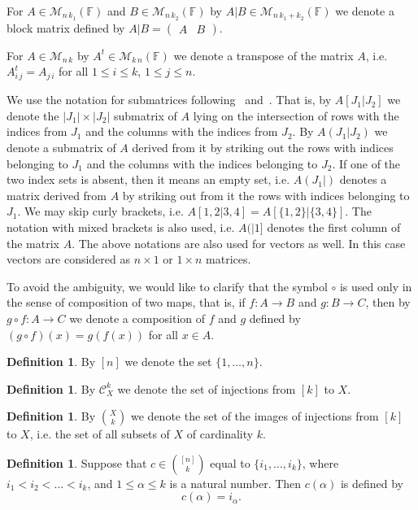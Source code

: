 \documentclass{elsarticle}
\def\F{{\mathbb F}}
\def\M{{\mathcal M}}
\theoremstyle{plain}
\theoremstyle{definition}
\newtheorem{definition}[theorem]{Definition}
\numberwithin{equation}{section}
\begin{document}
For $A \in \M_{n\,k_1}(\F)$ and $B \in \M_{n\,k_2}(\F)$ by $A|B \in \M_{n\,k_1+k_2}(\F)$ we denote a block matrix defined by $A|B = \begin{pmatrix} A & B\end{pmatrix}$.

For $A \in \M_{n\,k}$ by $A^t \in \M_{k\,n}(\F)$ we denote a transpose of the matrix $A$, i.e. $A^{t}_{i\,j} = A_{j\,i}$ for all $1 \le i \le k$, $1 \le j \le n$.


We use the notation for submatrices following~\cite{Minc1984} and~\cite{Pierce1979}. That is, by $A[J_1|J_2]$ we denote the $|J_1 |\times |J_2|$ submatrix of $A$ lying on the intersection of rows with
the indices from $J_1$ and the columns with the indices from $J_2$. By $A(J_1|J_2)$ we denote a submatrix of $A$ derived from it by striking out the rows with indices belonging to $J_1$ and the columns with the indices belonging to $J_2$. If one of the two index sets is absent, then it means an empty set, i.e. $A(J_1|)$ denotes a matrix derived from $A$ by striking out from it the rows with indices belonging to $J_1$. We may skip curly brackets, i.e. $A[1,2|3,4] = A[\{1,2\}|\{3,4\}]$. The notation with mixed brackets is also used, i.e. $A(|1]$ denotes the first column of the matrix $A$. The above notations are also used for vectors as well. In this case vectors are considered as $n\times 1$ or $1 \times n$ matrices.

To avoid the ambiguity, we would like to clarify that the symbol $\circ$ is used  only in the sense of composition of two maps, that is, if $f \colon A \to B$ and $g \colon B \to C$, then by $g\circ f\colon A \to C$ we denote a composition of $f$ and $g$ defined by $(g\circ f)(x) = g(f(x))$ for all $x \in A$. 

\begin{definition}
By $[n]$ we denote the set $\{1, \ldots, n\}$.
\end{definition}
\begin{definition}
 By $\mathcal C_{X}^{k}$ we denote the set of injections from $[k]$ to $X$.
\end{definition}
\begin{definition}By $\binom{X}{k}$ we denote the set of the images of injections from $[k]$ to $X$, i.e. the set of all subsets of $X$ of cardinality $k.$
\end{definition}


\begin{definition}Suppose that $c \in \binom{[n]}{k}$ equal to $\{i_1,\ldots, i_k\}$, where $i_1 < i_2 < \ldots < i_k$, and $1 \le \alpha \le k$ is a natural number. Then $c(\alpha)$ is defined by
$$c(\alpha) = i_{\alpha}.$$
\end{definition}
\end{document}
